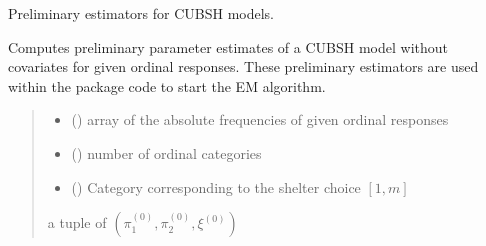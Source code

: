 \documentclass[letterpaper,10pt,english]{sphinxmanual}
\begin{document}
\begin{fulllineitems}
\label{\detokenize{cubmods:cubmods.cubsh.init_theta}}
\pysigstartsignatures
{}
\pysigstopsignatures
\sphinxAtStartPar
Preliminary estimators for CUBSH models.

\sphinxAtStartPar
Computes preliminary parameter estimates of a CUBSH model without covariates for given ordinal
responses. These preliminary estimators are used within the package code to start the E\sphinxhyphen{}M algorithm.
\begin{quote}\begin{description}
\begin{itemize}
\item {} 
\sphinxAtStartPar
{} () \textendash{} array of the absolute frequencies of given ordinal responses

\item {} 
\sphinxAtStartPar
{} () \textendash{} number of ordinal categories

\item {} 
\sphinxAtStartPar
{} () \textendash{} Category corresponding to the shelter choice \([1,m]\)

\end{itemize}

\sphinxAtStartPar
a tuple of \((\pi_1^{(0)}, \pi_2^{(0)}, \xi^{(0)})\)

\end{description}\end{quote}

\end{fulllineitems}

\end{document}
